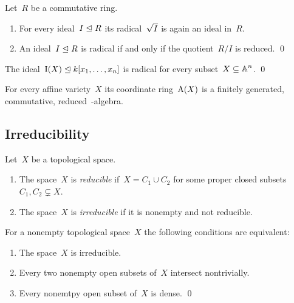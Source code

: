 \begin{lemma}
  Let~$R$ be a commutative ring.
  \begin{enumerate}
    \item
      For every ideal~$I \trianglelefteq R$ its radical~$\sqrt{I}$ is again an ideal in~$R$.
    \item
      An ideal~$I \trianglelefteq R$ is radical if and only if the quotient~$R/I$ is reduced.
    \qed
  \end{enumerate}
\end{lemma}


\begin{lemma}
  The ideal~$\operatorname{I}(X) \trianglelefteq k[x_1, \dotsc, x_n]$ is radical for every subset~$X \subseteq \operatorname{\mathbb{A}}^n$.
  \qed
\end{lemma}


\begin{corollary}
  \label{coordinate ring is fg commutative reduced}
  For every affine variety~$X$ its coordinate ring~$\operatorname{A}(X)$ is a finitely generated, commutative, reduced~-algebra.
\end{corollary}





\subsection{Irreducibility}


\begin{definition}
  Let~$X$ be a topological space.
  \begin{enumerate}
    \item
      The space~$X$ is \emph{reducible} if~$X = C_1 \cup C_2$ for some proper closed subsets~$C_1, C_2 \subsetneq X$.
    \item
      The space~$X$ is \emph{irreducible} if it is nonempty and not reducible.
  \end{enumerate}
\end{definition}


\begin{lemma}
  For a nonempty topological space~$X$ the following conditions are equivalent:
  \begin{enumerate}
    \item
      The space~$X$ is irreducible.
    \item
      Every two nonempty open subsets of~$X$ intersect nontrivially.
    \item
      Every nonemtpy open subset of~$X$ is dense.
    \qed
  \end{enumerate}
\end{lemma}


